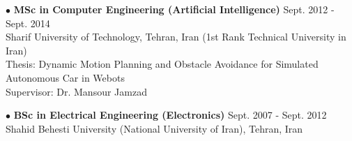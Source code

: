 \documentclass[10pt]{res}
\begin{document}
\begin{resume}
$\bullet$ \textbf{{MSc} in Computer Engineering (Artificial Intelligence)} \hfill Sept. 2012 - Sept. 2014\\ 
Sharif University of Technology, Tehran, Iran (1st Rank Technical University in Iran)\\
Thesis: Dynamic Motion Planning and Obstacle Avoidance for Simulated Autonomous Car in Webots \\
Supervisor: Dr. Mansour Jamzad\\
\vspace{-14pt}



$\bullet$ \textbf{{BSc} in Electrical Engineering (Electronics)} \hfill Sept. 2007 - Sept. 2012\\ 
Shahid Behesti University (National University of Iran), Tehran, Iran  \\




\vspace{-12pt} %
 




\end{resume}
\end{document}
